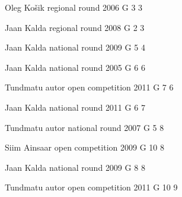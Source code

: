 \documentclass[11pt]{article}
\begin{document}
\ylDisplay{} %
{Oleg Košik} %
{regional round} %
{2006} %
{G 3} %
{3} %
{

\ifEngSolution
\fi
}

\ylDisplay{} %
{Jaan Kalda} %
{regional round} %
{2008} %
{G 2} %
{3} %
{

\ifEngSolution
\fi
}

\ylDisplay{} %
{Jaan Kalda} %
{national round} %
{2009} %
{G 5} %
{4} %
{

\ifEngSolution
\fi
}

\ylDisplay{} %
{Jaan Kalda} %
{national round} %
{2005} %
{G 6} %
{6} %
{

\ifEngSolution
\fi
}

\ylDisplay{} %
{Tundmatu autor} %
{open competition} %
{2011} %
{G 7} %
{6} %
{

\ifEngSolution
\fi
}

\ylDisplay{} %
{Jaan Kalda} %
{national round} %
{2011} %
{G 6} %
{7} %
{

\ifEngSolution
\fi
}

\ylDisplay{} %
{Tundmatu autor} %
{national round} %
{2007} %
{G 5} %
{8} %
{

\ifEngSolution
\fi
}

\ylDisplay{} %
{Siim Ainsaar} %
{open competition} %
{2009} %
{G 10} %
{8} %
{

\ifEngSolution
\fi
}

\ylDisplay{} %
{Jaan Kalda} %
{national round} %
{2009} %
{G 8} %
{8} %
{

\ifEngSolution
\fi
}

\ylDisplay{} %
{Tundmatu autor} %
{open competition} %
{2011} %
{G 10} %
{9} %
{

\ifEngSolution
\fi
}
\end{document}
